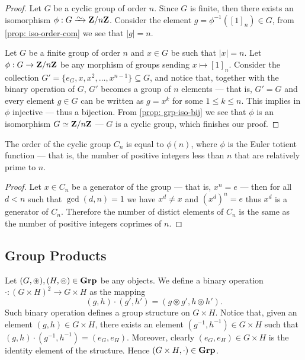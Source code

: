 \begin{proof}
Let \(G\) be a cyclic group of order \(n\). Since \(G\) is finite, then there
exists an isomorphism \(\phi: G \isoto \Z/n\Z\). Consider the element \(g =
\phi^{-1}({[1]}_n) \in G\), from \cref{prop: iso-order-com} we see that \(|g| =
n\).

Let \(G\) be a finite group of order \(n\) and \(x \in G\) be such that \(|x|
= n\). Let \(\phi: G \to \mathbf{Z}/n\mathbf{Z}\) be any morphism of groups sending \(x
\mapsto {[1]}_n\). Consider the collection \(G' = \{e_G, x, x^2, \dots,
x^{n-1}\} \subseteq G\), and notice that, together with the binary operation
of \(G\), \(G'\) becomes a group of \(n\) elements --- that is, \(G' = G\) and
every element \(g \in G\) can be written as \(g = x^k\) for some \(1 \leq k
\leq n\). This implies in \(\phi\) injective --- thus a bijection. From
\cref{prop: grp-iso-bij} we see that \(\phi\) is an isomorphism \(G \simeq
\mathbf{Z}/n\mathbf{Z}\) --- \(G\) is a cyclic group, which finishes our proof.
\end{proof}

\begin{proposition}
\label{prop:order-cyclic-totient}
The order of the cyclic group \(C_n\) is equal to \(\phi(n)\), where \(\phi\) is
the Euler totient function --- that is, the number of positive integers less
than \(n\) that are relatively prime to \(n\).
\end{proposition}

\begin{proof}
Let \(x \in C_n\) be a generator of the group --- that is, \(x^n = e\) --- then
for all \(d < n\) such that \(\gcd(d, n) = 1\) we have \(x^d \neq x\) and
\((x^d)^n = e\) thus \(x^d\) is a generator of \(C_n\). Therefore the number
of distict elements of \(C_n\) is the same as the number of positive integers
coprimes of \(n\).
\end{proof}

\subsection{Group Products}

Let \((G, \circledast), (H, \circledcirc) \in {\textbf{Grp}}\) be any objects. We define a
binary operation \(\cdot: (G \times H)^2 \to G \times H\) as the mapping
\begin{equation}\label{eq: grp-prod-bin}
(g, h) \cdot (g', h') = (g \circledast g', h \circledcirc h').
\end{equation}
Such binary operation defines a group structure on \(G \times H\). Notice that,
given an element \((g, h) \in G \times H\), there exists an element \((g^{-1},
h^{-1}) \in G \times H\) such that \((g, h) \cdot (g^{-1}, h^{-1}) = (e_G,
e_H)\). Moreover, clearly \((e_G, e_H) \in G \times H\) is the identity element
of the structure. Hence \((G \times H, \cdot) \in {\textbf{Grp}}\).

